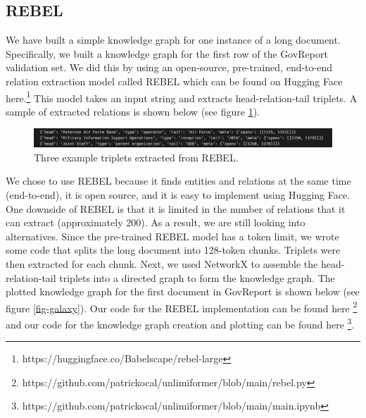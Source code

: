 \subsection*{REBEL}
We have built a simple knowledge graph for one instance of a long document.
Specifically, we built a knowledge graph for the first row of the GovReport
validation set. We did this by using an open-source, pre-trained, end-to-end
relation extraction model called REBEL
\cite{huguet2021rebel} which can be found on Hugging
Face here.\footnote{https://huggingface.co/Babelscape/rebel-large} This model
takes an input string and extracts head-relation-tail triplets. A sample of
extracted relations is shown below (see figure \ref{fig-triplets}).

 \begin{figure}[htp]
    \centering
    \includegraphics[width=17cm]{images/relations_example.png}
    \caption{Three example triplets extracted from REBEL.}
    \label{fig-triplets}
\end{figure}

We chose to use REBEL because it finds entities and relations at the same time
(end-to-end), it is open source, and it is easy to implement using Hugging
Face. One downside of REBEL is that it is limited in the number of relations
that it can extract (approximately 200).   As a result, we are still looking
into alternatives. Since the pre-trained REBEL model has a token limit, we
wrote some code that splits the long document into 128-token chunks. Triplets
were then extracted for each chunk. Next, we used NetworkX to assemble the
head-relation-tail triplets into a directed graph to form the knowledge graph.
The plotted knowledge graph for the first document in GovReport is shown below
(see figure \ref{fig-galaxy}). Our code for the REBEL implementation can be
found here
\footnote{https://github.com/patrickocal/unlimiformer/blob/main/rebel.py} and
our code for the knowledge graph creation and plotting can be found here
\footnote{https://github.com/patrickocal/unlimiformer/blob/main/main.ipynb}. 



